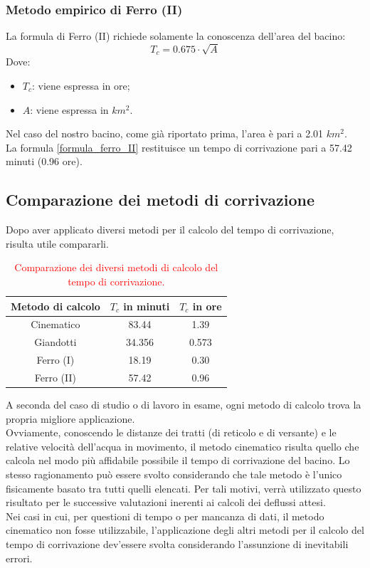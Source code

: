 \subsubsection{Metodo empirico di Ferro (II)}
La formula di Ferro (II) richiede solamente la conoscenza dell'area del bacino:
\begin{equation}
    T_c = 0.675 \cdot \sqrt{A}
    \label{formula_ferro_II}
\end{equation}
Dove:
\begin{itemize}
    \item $T_c$: viene espressa in ore;
    \item $A$: viene espressa in $km^2$.
\end{itemize}
Nel caso del nostro bacino, come già riportato prima, l'area è pari a 2.01 $km^2$.\\
La formula \ref{formula_ferro_II} restituisce un tempo di corrivazione pari a 57.42 minuti (0.96 ore).

\subsection{Comparazione dei metodi di corrivazione}
Dopo aver applicato diversi metodi per il calcolo del tempo di corrivazione, risulta utile compararli.
\begin{table}[H] \centering
    \caption{\textcolor{red}{Comparazione dei diversi metodi di calcolo del tempo di corrivazione.}}
    \begin{tabular}{ccc}
        \toprule
  Metodo di calcolo   & $T_c$ in minuti & $T_c$ in ore\\
     \midrule
   Cinematico  & 83.44 & 1.39\\
   Giandotti  & 34.356 & 0.573\\
   Ferro (I)  & 18.19 & 0.30\\
   Ferro (II)  &57.42 & 0.96\\
     \bottomrule
    \end{tabular}
    \end{table}
A seconda del caso di studio o di lavoro in esame, ogni metodo di calcolo trova la propria migliore applicazione.\\
Ovviamente, conoscendo le distanze dei tratti (di reticolo e di versante) e le relative velocità dell'acqua in movimento, il metodo cinematico risulta quello che calcola nel modo più affidabile possibile il tempo di corrivazione del bacino. Lo stesso ragionamento può essere svolto considerando che tale metodo è l'unico fisicamente basato tra tutti quelli elencati. Per tali motivi, verrà utilizzato questo risultato per le successive valutazioni inerenti ai calcoli dei deflussi attesi.\\
Nei casi in cui, per questioni di tempo o per mancanza di dati, il metodo cinematico non fosse utilizzabile, l'applicazione degli altri metodi per il calcolo del tempo di corrivazione dev'essere svolta considerando l'assunzione di inevitabili errori. 

